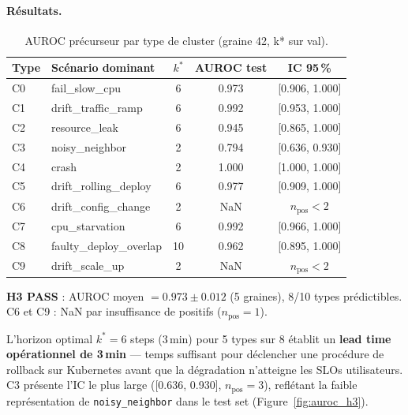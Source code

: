 \paragraph{Résultats.}

\begin{table}[h]
\centering
\caption{AUROC précurseur par type de cluster (graine 42, k* sur val).}
\label{tab:h3}
\begin{tabular}{llccc}
\toprule
\textbf{Type} & \textbf{Scénario dominant} & \textbf{$k^*$} & \textbf{AUROC test} & \textbf{IC 95\,\%} \\
\midrule
C0 & fail\_slow\_cpu       & 6  & 0.973 & [0.906, 1.000] \\
C1 & drift\_traffic\_ramp  & 6  & 0.992 & [0.953, 1.000] \\
C2 & resource\_leak        & 6  & 0.945 & [0.865, 1.000] \\
C3 & noisy\_neighbor       & 2  & 0.794 & [0.636, 0.930] \\
C4 & crash                 & 2  & 1.000 & [1.000, 1.000] \\
C5 & drift\_rolling\_deploy& 6  & 0.977 & [0.909, 1.000] \\
C6 & drift\_config\_change & 2  & NaN   & $n_\text{pos} < 2$ \\
C7 & cpu\_starvation       & 6  & 0.992 & [0.966, 1.000] \\
C8 & faulty\_deploy\_overlap& 10 & 0.962 & [0.895, 1.000] \\
C9 & drift\_scale\_up      & 2  & NaN   & $n_\text{pos} < 2$ \\
\bottomrule
\end{tabular}
\end{table}

\textbf{H3 \checkmark{} PASS} : AUROC moyen $= 0.973 \pm 0.012$ (5 graines),
8/10 types prédictibles. C6 et C9 : NaN par insuffisance de positifs ($n_\text{pos} = 1$).

L'horizon optimal $k^* = 6$ steps (3\,min) pour 5 types sur 8 établit un
\textbf{lead time opérationnel de 3\,min} --- temps suffisant pour déclencher une
procédure de rollback sur Kubernetes avant que la dégradation n'atteigne les SLOs utilisateurs.
C3 présente l'IC le plus large ([0.636, 0.930], $n_\text{pos} = 3$),
reflétant la faible représentation de \texttt{noisy\_neighbor} dans le test set
(Figure~\ref{fig:auroc_h3}).

